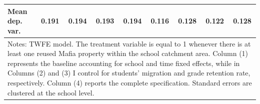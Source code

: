 \documentclass[12pt]{article}
\theoremstyle{plain}
\theoremstyle{plain}
\theoremstyle{plain}
\theoremstyle{definition}
\theoremstyle{plain}
\theoremstyle{definition}
\theoremstyle{plain}
\theoremstyle{remark}
\theoremstyle{definition}
\theoremstyle{definition}
\theoremstyle{plain}
\begin{document}
\begin{table}[H]
{\begin{tabular}{p{14.835em}llllllll}
			\multicolumn{1}{l}{Mean dep. var.} & \multicolumn{1}{c}{0.191} & \multicolumn{1}{c}{0.194} & \multicolumn{1}{c}{0.193} & \multicolumn{1}{c}{0.194} & \multicolumn{1}{c}{0.116} & \multicolumn{1}{c}{0.128} & \multicolumn{1}{c}{0.122} & \multicolumn{1}{c}{0.128} \\
			\midrule
			\multicolumn{9}{p{47.275em}}{Notes: TWFE model. The treatment variable is equal to 1 whenever there is at least one reused Mafia property within the school catchment area. Column (1) represents the baseline accounting for school and time fixed effects, while in Columns (2) and (3) I control for students' migration and grade retention rate, respectively. Column (4) reports the complete specification. Standard errors are clustered at the school level.} \\
		\end{tabular}%
	}
\end{table}
\end{document}
